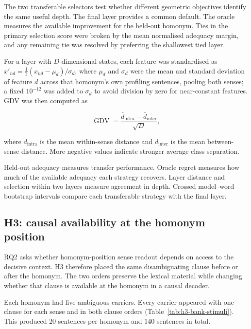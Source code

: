 \documentclass[conference]{IEEEtran}
\begin{document}
The two transferable selectors test whether different geometric objectives
identify the same useful depth. The final layer provides a common default. The
oracle measures the available improvement for the held-out homonym. Ties in
the primary selection score were broken by the mean normalised adequacy
margin, and any remaining tie was resolved by preferring the shallowest tied
layer.

For a layer with $D$-dimensional states, each feature was standardised as
$x'_{nd}=\tfrac{1}{2}(x_{nd}-\mu_d)/\sigma_d$, where $\mu_d$ and $\sigma_d$
were the mean and standard deviation of feature $d$ across that homonym's own
profiling sentences, pooling both senses; a fixed $10^{-12}$ was added to
$\sigma_d$ to avoid division by zero for near-constant features. GDV was then
computed as

\begin{equation}
\operatorname{GDV}=
\frac{\bar d_{\mathrm{intra}}-\bar d_{\mathrm{inter}}}{\sqrt{D}},
\label{eq:gdv}
\end{equation}

where $\bar d_{\mathrm{intra}}$ is the mean within-sense distance and
$\bar d_{\mathrm{inter}}$ is the mean between-sense distance. More negative
values indicate stronger average class separation.

Held-out adequacy measures transfer performance. Oracle regret measures how
much of the available adequacy each strategy recovers. Layer distance and
selection within two layers measure agreement in depth. Crossed model--word
bootstrap intervals compare each transferable strategy with the final layer.

\subsection{H3: causal availability at the homonym position}
\label{sec:h3-method}

RQ2 asks whether homonym-position sense readout depends on access to the
decisive context. H3 therefore placed the same disambiguating clause before or
after the homonym. The two orders preserve the lexical material while changing
whether that clause is available at the homonym in a causal decoder.

Each homonym had five ambiguous carriers. Every carrier appeared with one
clause for each sense and in both clause orders
(Table~\ref{tab:h3-bank-stimuli}). This produced 20 sentences per homonym and
140 sentences in total.
\end{document}
